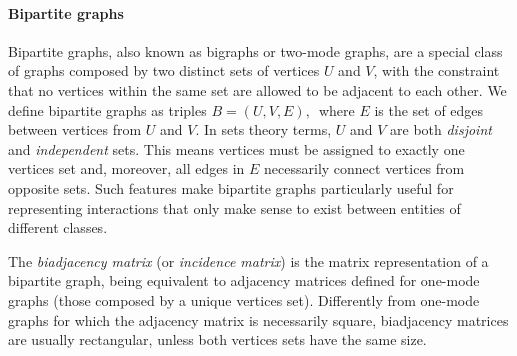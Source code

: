 \paragraph*{Bipartite graphs}
Bipartite graphs, also known as bigraphs or two-mode graphs, are a special class of graphs composed by two distinct sets of vertices $U$ and $V$, with the constraint that no vertices within the same set are allowed to be adjacent to each other. 
We define bipartite graphs as triples 
$
B = (U, V, E) \mbox{, }
$
where $E$ is the set of edges between vertices from $U$ and $V$.
In sets theory terms, $U$ and $V$ are both \textit{disjoint} and \textit{independent} sets.
This means vertices must be assigned to exactly one vertices set and, moreover, all edges in $E$ necessarily connect vertices from opposite sets. 
Such features make bipartite graphs particularly useful for representing interactions that only make sense to exist between entities of different classes. 

The \textit{biadjacency matrix} (or \textit{incidence matrix}) is the matrix representation of a bipartite graph, being equivalent to adjacency matrices defined for one-mode graphs (those composed by a unique vertices set). 
Differently from one-mode graphs for which the adjacency matrix is necessarily square, biadjacency matrices are usually rectangular, unless both vertices sets have the same size.

